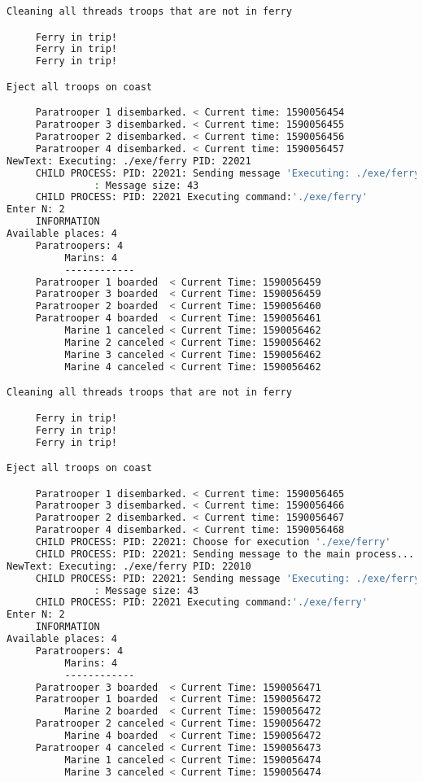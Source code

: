 \documentclass{article}
\begin{document}
\begin{lstlisting}[language=BASH]
Cleaning all threads troops that are not in ferry

     Ferry in trip!
     Ferry in trip!
     Ferry in trip!

Eject all troops on coast

     Paratrooper 1 disembarked. < Current time: 1590056454
     Paratrooper 3 disembarked. < Current time: 1590056455
     Paratrooper 2 disembarked. < Current time: 1590056456
     Paratrooper 4 disembarked. < Current time: 1590056457
NewText: Executing: ./exe/ferry PID: 22021
     CHILD PROCESS: PID: 22021: Sending message 'Executing: ./exe/ferry PID: 22021' to the MAIN process...
               : Message size: 43
     CHILD PROCESS: PID: 22021 Executing command:'./exe/ferry'
Enter N: 2
     INFORMATION
Available places: 4
     Paratroopers: 4
          Marins: 4
          ------------
     Paratrooper 1 boarded  < Current Time: 1590056459 
     Paratrooper 3 boarded  < Current Time: 1590056459 
     Paratrooper 2 boarded  < Current Time: 1590056460 
     Paratrooper 4 boarded  < Current Time: 1590056461 
          Marine 1 canceled < Current Time: 1590056462 
          Marine 2 canceled < Current Time: 1590056462 
          Marine 3 canceled < Current Time: 1590056462 
          Marine 4 canceled < Current Time: 1590056462 

Cleaning all threads troops that are not in ferry

     Ferry in trip!
     Ferry in trip!
     Ferry in trip!

Eject all troops on coast

     Paratrooper 1 disembarked. < Current time: 1590056465
     Paratrooper 3 disembarked. < Current time: 1590056466
     Paratrooper 2 disembarked. < Current time: 1590056467
     Paratrooper 4 disembarked. < Current time: 1590056468
     CHILD PROCESS: PID: 22021: Choose for execution './exe/ferry'
     CHILD PROCESS: PID: 22021: Sending message to the main process...
NewText: Executing: ./exe/ferry PID: 22010
     CHILD PROCESS: PID: 22021: Sending message 'Executing: ./exe/ferry PID: 22010' to the MAIN process...
               : Message size: 43
     CHILD PROCESS: PID: 22021 Executing command:'./exe/ferry'
Enter N: 2
     INFORMATION
Available places: 4
     Paratroopers: 4
          Marins: 4
          ------------
     Paratrooper 3 boarded  < Current Time: 1590056471 
     Paratrooper 1 boarded  < Current Time: 1590056472 
          Marine 2 boarded  < Current Time: 1590056472 
     Paratrooper 2 canceled < Current Time: 1590056472 
          Marine 4 boarded  < Current Time: 1590056472 
     Paratrooper 4 canceled < Current Time: 1590056473 
          Marine 1 canceled < Current Time: 1590056474 
          Marine 3 canceled < Current Time: 1590056474 


\end{lstlisting}
\end{document}
